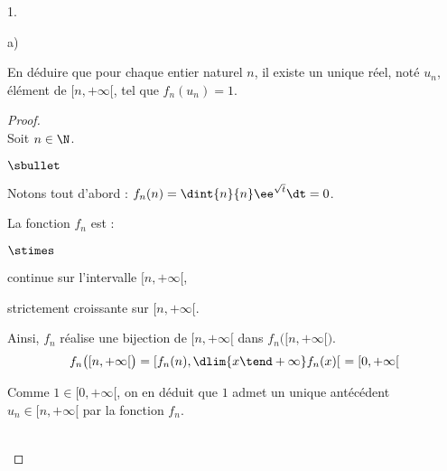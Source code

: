 \begin{noliste}{1.}
\begin{noliste}{a)}
  \item En déduire que pour chaque entier naturel $n$, il existe un
    unique réel, noté $u_n$, élément de $[n, + \infty[$, tel que
    $f_{n}(u_n) = 1$.

    \begin{proof}~\\
      Soit $n \in \N$.
      \begin{noliste}{$\sbullet$}
      \item Notons tout d'abord : $f_n(n) = \dint{n}{n}
        \ee^{\sqrt{t}}\dt = 0$.

      \item La fonction $f_n$ est :
        \begin{noliste}{$\stimes$}
        \item continue sur l'intervalle $[n,+\infty[$,
        \item strictement croissante sur $[n,+\infty[$.
        \end{noliste}
        Ainsi, $f_n$ réalise une bijection de $[n,+\infty[$ dans
        $f_n\big([n,+\infty[\big)$.
        \[
        f_n\big([n,+\infty[\big) = [f_n(n), \dlim{x \tend +\infty}
        f_n(x) [ \ = [0, +\infty[
        \]

      \item Comme $1 \in [0, +\infty[$, on en déduit que $1$ admet un
        unique antécédent $u_n \in [n, +\infty[$ par la fonction
        $f_n$.
      \end{noliste}
      \conc{Ainsi, il existe un unique réel $u_n\in[n,+\infty[$ tel
        que $f_n(u_n) = 1$.}~\\[-1.2cm]
    \end{proof}
  \end{noliste}


\end{noliste}
